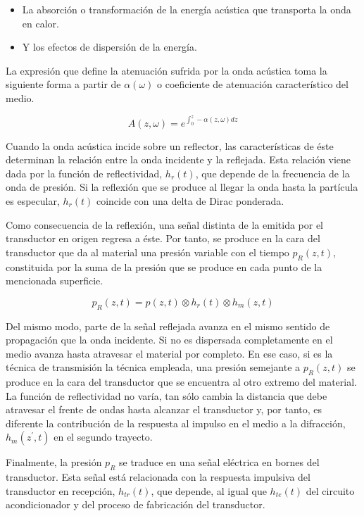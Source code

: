 \begin{itemize}
	\item La absorción o transformación de la energía acústica que transporta la onda en calor.
	\item Y los efectos de dispersión de la energía.
\end{itemize}

La expresión que define la atenuación sufrida por la onda acústica toma la siguiente forma a partir de $\alpha(\omega)$ o coeficiente de atenuación característico del medio.

\begin{equation}
	A(z, \omega) = e^{\int^z_0 -\alpha(z, \omega)dz} 
	\label{eq:loss}
\end{equation}

Cuando la onda acústica incide sobre un reflector, las características de éste determinan la relación entre la onda incidente y la reflejada. Esta relación viene dada por la función de reflectividad, $h_r(t)$, que depende de la frecuencia de la onda de presión. Si la reflexión que se produce al llegar la onda hasta la partícula es especular, $h_r(t)$ coincide con una delta de Dirac ponderada.\par
Como consecuencia de la reflexión, una señal distinta de la emitida por el transductor en origen regresa a éste. Por tanto, se produce en la cara del transductor que da al material una presión variable con el tiempo $p_R(z, t)$, constituida por la suma de la presión que se produce en cada punto de la mencionada superficie.\par

\begin{equation}
	p_R(z, t) = p(z, t)\otimes h_r(t)\otimes h_m(z, t)
	\label{eq:recpressure}
\end{equation}

Del mismo modo, parte de la señal reflejada avanza en el mismo sentido de propagación que la onda incidente. Si no es dispersada completamente en el medio avanza hasta atravesar el material por completo. En ese caso, si es la técnica de transmisión la técnica empleada, una presión semejante a $p_R(z, t)$ se produce en la cara del transductor que se encuentra al otro extremo del material. La función de reflectividad no varía, tan sólo cambia la distancia que debe atravesar el frente de ondas hasta alcanzar el transductor y, por tanto, es diferente la contribución de la respuesta al impulso en el medio a la difracción, $h_m(z^\prime, t)$ en el segundo trayecto.\par
Finalmente, la presión $p_R$ se traduce en una señal eléctrica en bornes del transductor. Esta señal está relacionada con la respuesta impulsiva del transductor en recepción, $h_{tr}(t)$, que depende, al igual que $h_{te}(t)$ del circuito acondicionador y del proceso de fabricación del transductor.

